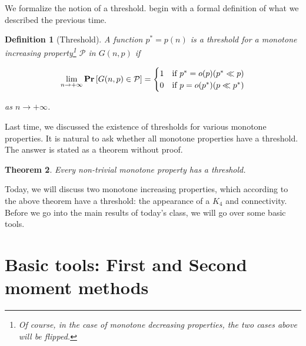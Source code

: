 \documentclass[twoside]{article}
\newcounter{lecnum}
\newtheorem{theorem}{Theorem}[lecnum]
\newtheorem{definition}[theorem]{Definition}
\newcommand{\Prob}[1]{{{\bf{Pr}}\left[{#1}\right]}}
\begin{document}
We formalize the notion of a threshold. begin with a formal definition of what we described the previous time.  

\begin{definition}[Threshold] 
A function $p^*=p(n)$ is a threshold for a monotone increasing 
property\footnote{Of course, in the case of monotone decreasing 
properties, the two cases above will be flipped.} $\mathcal{P}$ 
in $G(n,p)$ if 

\[
 \lim_{n \rightarrow +\infty} \Prob{ G(n,p) \in \mathcal{P}}  =
  \begin{cases}
   1       & \text{if } p^*=o(p) (p^* \ll p) \\
   0       & \text{if } p=o(p^*) (p \ll p^*)
  \end{cases}
\]

\noindent as $n \rightarrow +\infty$. 

\end{definition}

Last time, we discussed the existence of thresholds for various monotone properties. 
It is natural to ask whether all monotone properties have a threshold. 
The answer is stated as a theorem without proof. 

\begin{theorem}
Every non-trivial monotone property has a threshold. 
\end{theorem} 

Today, we will discuss two monotone increasing properties, which according to the above theorem 
have a threshold: the appearance of a $K_4$ and connectivity. 
Before we go into the main results of today's class, we will go over 
some basic  tools. 

\section{Basic tools: First and Second moment methods}
\end{document}
